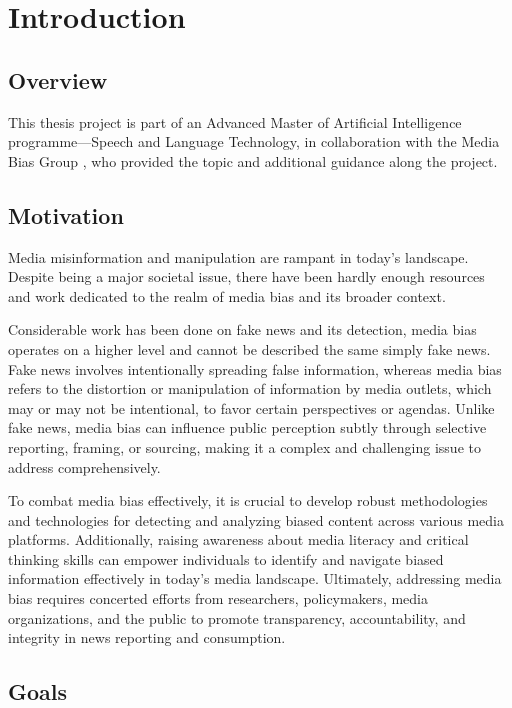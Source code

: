 \chapter{Introduction}
\label{cha:1}

\section{Overview}

This thesis project is part of an Advanced Master of Artificial Intelligence programme—Speech and Language Technology, in collaboration with the Media Bias Group \cite{media-bias-group}, who provided the topic and additional guidance along the project.

\section{Motivation}

Media misinformation and manipulation are rampant in today's landscape. Despite being a major societal issue, there have been hardly enough resources and work dedicated to the realm of media bias and its broader context.

Considerable work has been done on fake news and its detection, media bias operates on a higher level and cannot be described the same simply fake news. Fake news involves intentionally spreading false information, whereas media bias refers to the distortion or manipulation of information by media outlets, which may or may not be intentional, to favor certain perspectives or agendas. Unlike fake news, media bias can influence public perception subtly through selective reporting, framing, or sourcing, making it a complex and challenging issue to address comprehensively.

To combat media bias effectively, it is crucial to develop robust methodologies and technologies for detecting and analyzing biased content across various media platforms. Additionally, raising awareness about media literacy and critical thinking skills can empower individuals to identify and navigate biased information effectively in today's media landscape. Ultimately, addressing media bias requires concerted efforts from researchers, policymakers, media organizations, and the public to promote transparency, accountability, and integrity in news reporting and consumption.

\section{Goals}

